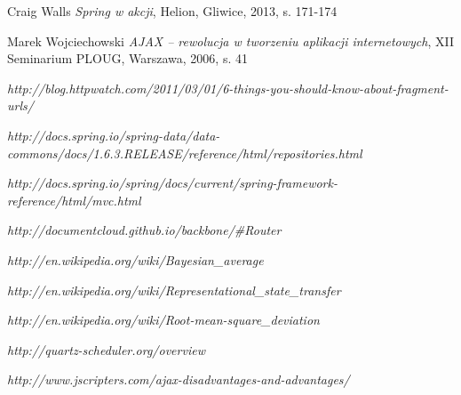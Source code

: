 \begin{thebibliography}{99}

	Craig Walls
	\emph{Spring w akcji},
	Helion,
	Gliwice, 2013,
	s. 171-174
	
	Marek Wojciechowski
	\emph{AJAX – rewolucja w tworzeniu aplikacji internetowych},
	XII Seminarium PLOUG,
	Warszawa, 2006,
	s. 41

	\emph{http://blog.httpwatch.com/2011/03/01/6-things-you-should-know-about-fragment-urls/}

	\emph{http://docs.spring.io/spring-data/data-commons/docs/1.6.3.RELEASE/reference/html/repositories.html}

	\emph{http://docs.spring.io/spring/docs/current/spring-framework-reference/html/mvc.html}
	
	\emph{http://documentcloud.github.io/backbone/\#Router}

	\emph{http://en.wikipedia.org/wiki/Bayesian\_average}
	
	\emph{http://en.wikipedia.org/wiki/Representational\_state\_transfer}	
		
	\emph{http://en.wikipedia.org/wiki/Root-mean-square\_deviation}
 
	\emph{http://quartz-scheduler.org/overview}

	\emph{http://www.jscripters.com/ajax-disadvantages-and-advantages/}

\end{thebibliography}
